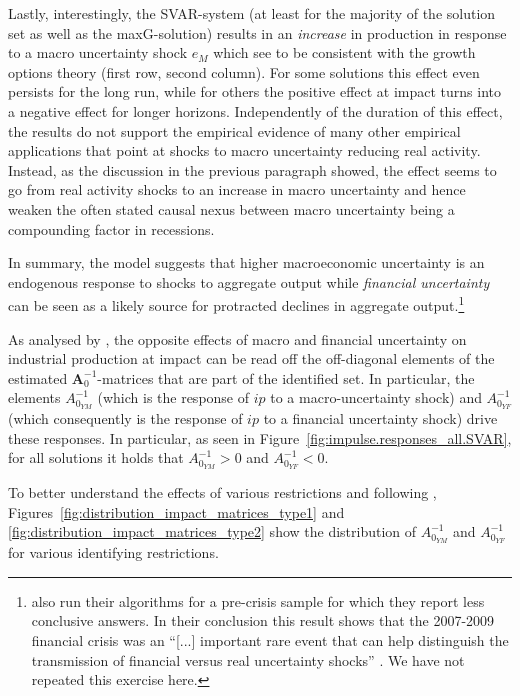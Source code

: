 \documentclass[a4paper,11pt,listof=nochaptergap,oneside,pointednumbers,bibtotoc,bigheadings,liststotoc,hidelinks]{scrbook}
\theoremstyle{mysatz}
\theoremstyle{mydefinition}
\theoremstyle{mytheorem}
\theoremstyle{mybemerkung}
\newcommand{\vect}[1]{\boldsymbol{\mathbf{#1}}}
\begin{document}
Lastly, interestingly, the SVAR-system (at least for the majority of the solution set as well as the maxG-solution) results in an \textit{increase} in production in response to a macro uncertainty shock $e_{M}$ which \citet{ludvigsonetal:18} see to be consistent with the growth options theory (first row, second column). For some solutions this effect even persists for the long run, while for others the positive effect at impact turns into a negative effect for longer horizons. Independently of the duration of this effect, the results do not support the empirical evidence of many other empirical applications that point at shocks to macro uncertainty reducing real activity. Instead, as the discussion in the previous paragraph showed, the effect seems to go from real activity shocks to an increase in macro uncertainty and hence weaken the often stated causal nexus between macro uncertainty being a compounding factor in recessions. 

In summary, the model suggests that higher macroeconomic uncertainty is an endogenous response to shocks to aggregate output while \textit{financial uncertainty} can be seen as a likely source for protracted declines in aggregate output.\footnote{\citet{ludvigsonetal:18} also run their algorithms for a pre-crisis sample for which they report less conclusive answers. In their conclusion this result shows that the 2007-2009 financial crisis was an ``[...] important rare event that can help distinguish the transmission of financial versus real uncertainty shocks'' \citet[p. 25]{ludvigsonetal:18}. We have not repeated this exercise here.}


As analysed by \citet{ludvigsonetal:19}, the opposite effects of macro and financial uncertainty on industrial production at impact can be read off the off-diagonal elements of the estimated $\vect{A}_0^{-1}$-matrices that are part of the identified set. In particular, the elements $A_{0_{YM}}^{-1}$ (which is the response of $ip$ to a macro-uncertainty shock) and $A_{0_{YF}}^{-1}$ (which consequently is the response of $ip$ to a financial uncertainty shock) drive these responses. In particular, as seen in Figure~\ref{fig:impulse.responses_all.SVAR}, for all solutions it holds that $A_{0_{YM}}^{-1} > 0$ and $A_{0_{YF}}^{-1} < 0$.

To better understand the effects of various restrictions and following \citet{ludvigsonetal:19}, Figures~\ref{fig:distribution_impact_matrices_type1} and \ref{fig:distribution_impact_matrices_type2} show the distribution of $A_{0_{YM}}^{-1}$ and $A_{0_{YF}}^{-1}$ for various identifying restrictions.
\end{document}
